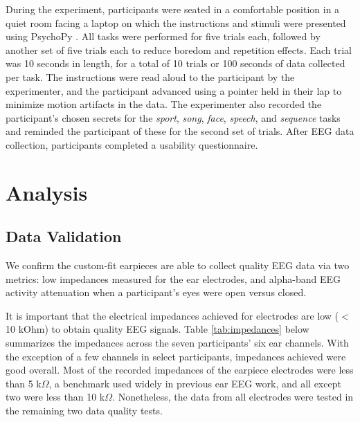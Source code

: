 \documentclass{sigchi}
\begin{document}
During the experiment, participants were seated in a comfortable position in a quiet room facing a laptop on which the instructions and stimuli were presented using PsychoPy \cite{peirce2007psychopy}. All tasks were performed for five trials each, followed by another set of five trials each to reduce boredom and repetition effects. Each trial was 10 seconds in length, for a total of 10 trials or 100 seconds of data collected per task. The instructions were read aloud to the participant by the experimenter, and the participant advanced using a pointer held in their lap to minimize motion artifacts in the data. The experimenter also recorded the participant's chosen secrets for the \textit{sport}, \textit{song}, \textit{face}, \textit{speech}, and \textit{sequence} tasks and reminded the participant of these for the second set of trials. After EEG data collection, participants completed a usability questionnaire.

\section{Analysis}
\subsection{Data Validation}

We confirm the custom-fit earpieces are able to collect quality EEG data via two metrics: low impedances measured for the ear electrodes, and alpha-band EEG activity attenuation when a participant's eyes were open versus closed.

It is important that the electrical impedances achieved for electrodes are low ($<$10 kOhm) to obtain quality EEG signals. Table \ref{tab:impedances} below summarizes the impedances across the seven participants' six ear channels. With the exception of a few channels in select participants, impedances achieved were good overall. Most of the recorded impedances of the earpiece electrodes were less than 5 k\(\Omega\), a benchmark used widely in previous ear EEG work, and all except two were less than 10 k\(\Omega\). Nonetheless, the data from all electrodes were tested in the remaining two data quality tests.
\end{document}
